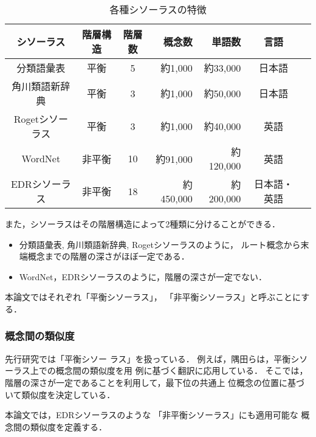 \begin{table}[htb]
\caption{各種シソーラスの特徴}
\label{tbl:thesaurus}
\small
\begin{center}
\renewcommand{\arraystretch}{}
\begin{tabular}{|c||c|c|r|r|c|l|}\hline
 シソーラス      & 階層構造 & 階層数 &  概念数 &   単語数 & 言語 \\\hline\hline
 分類語彙表      & 平衡 & 5  & 約1,000   & 約33,000  & 日本語 \\\hline
 角川類語新辞典  & 平衡 & 3  & 約1,000   & 約50,000  & 日本語 \\\hline
 Rogetシソーラス & 平衡 & 3  & 約1,000   & 約40,000  & 英語   \\\hline\hline
 WordNet         & 非平衡 & 10 & 約91,000  & 約120,000 & 英語 \\\hline
 EDRシソーラス   & 非平衡 & 18 & 約450,000\footnotemark\hspace*{-0.45em} & 約200,000 & 日本語・英語 \\\hline
\end{tabular}
\end{center}
\end{table}


また，シソーラスはその階層構造によって2種類に分けることができる．
\begin{itemize}
\item 分類語彙表, 角川類語新辞典, Rogetシソーラスのように，
ルート概念から末端概念までの階層の深さがほぼ一定である．
\item WordNet，EDRシソーラスのように，階層の深さが一定でない．
\end{itemize}
本論文ではそれぞれ「平衡シソーラス」，
「非平衡シソーラス」と呼ぶことにする．

\subsubsection{概念間の類似度}\label{sec:sim-con}
先行研究\cite{Sato90,Sumita92,Kurohashi92,Mima96}では「平衡シソー
ラス」を扱っている．
例えば，隅田ら\cite{Sumita92}は，平衡シソーラス上での概念間の類似度を用
例に基づく翻訳に応用している． 
そこでは，階層の深さが一定であることを利用して，最下位の共通上
位概念の位置に基づいて類似度を決定している．

本論文では，EDRシソーラスのような
「非平衡シソーラス」にも適用可能な
概念間の{\dg 類似度}を定義する． 

